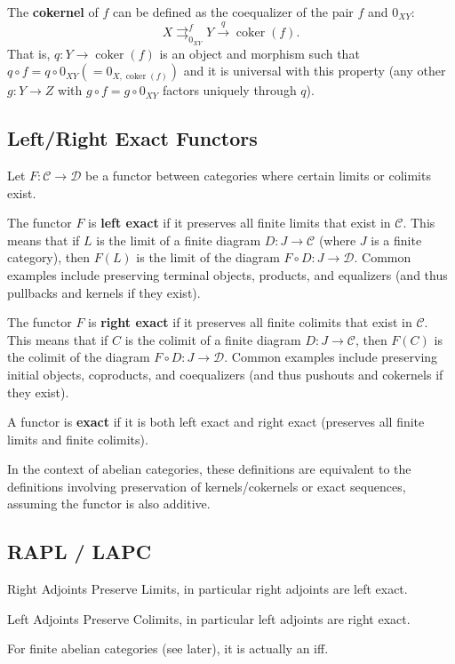 \documentclass[11pt]{article}
\theoremstyle{definition}
\begin{document}
The \textbf{cokernel} of $f$ can be defined as the coequalizer of the pair $f$ and $0_{XY}$:
\[
X \rightrightarrows^{f}_{0_{XY}} Y \xrightarrow{q} \operatorname{coker}(f).
\]
That is, $q: Y \to \operatorname{coker}(f)$ is an object and morphism such that $q \circ f = q \circ 0_{XY} (= 0_{X, \operatorname{coker}(f)})$ and it is universal with this property (any other $g: Y \to Z$ with $g \circ f = g \circ 0_{XY}$ factors uniquely through $q$).

\subsection{Left/Right Exact Functors}
Let $F: \mathcal{C} \to \mathcal{D}$ be a functor between categories where certain limits or colimits exist.

The functor $F$ is \textbf{left exact} if it preserves all finite limits that exist in $\mathcal{C}$. This means that if $L$ is the limit of a finite diagram $D: J \to \mathcal{C}$ (where $J$ is a finite category), then $F(L)$ is the limit of the diagram $F \circ D: J \to \mathcal{D}$. Common examples include preserving terminal objects, products, and equalizers (and thus pullbacks and kernels if they exist).

The functor $F$ is \textbf{right exact} if it preserves all finite colimits that exist in $\mathcal{C}$. This means that if $C$ is the colimit of a finite diagram $D: J \to \mathcal{C}$, then $F(C)$ is the colimit of the diagram $F \circ D: J \to \mathcal{D}$. Common examples include preserving initial objects, coproducts, and coequalizers (and thus pushouts and cokernels if they exist).

A functor is \textbf{exact} if it is both left exact and right exact (preserves all finite limits and finite colimits).

In the context of abelian categories, these definitions are equivalent to the definitions involving preservation of kernels/cokernels or exact sequences, assuming the functor is also additive.


\subsection{RAPL / LAPC}

Right Adjoints Preserve Limits, in particular right adjoints are left exact.

Left Adjoints Preserve Colimits, in particular left adjoints are right exact.

For finite abelian categories (see later), it is actually an iff.
\end{document}

